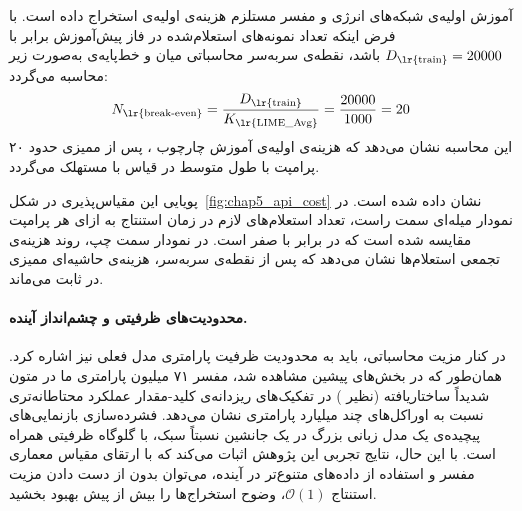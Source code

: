 آموزش اولیه‌ی شبکه‌های انرژی و مفسر مستلزم هزینه‌ی اولیه‌ی استخراج داده است. با فرض اینکه تعداد نمونه‌های استعلام‌شده در فاز پیش‌آموزش برابر با $D_{\text{\lr{train}}} = 20000$ باشد، نقطه‌ی سربه‌سر محاسباتی میان  و خط‌پایه‌ی  به‌صورت زیر محاسبه می‌گردد:
\begin{equation}
    N_{\text{\lr{break-even}}} = \frac{D_{\text{\lr{train}}}}{K_{\text{\lr{LIME\_Avg}}}} = \frac{20000}{1000} = 20
\end{equation}
این محاسبه نشان می‌دهد که هزینه‌ی اولیه‌ی آموزش چارچوب ، پس از ممیزی حدود ۲۰ پرامپت با طول متوسط در قیاس با  مستهلک می‌گردد.

پویایی این مقیاس‌پذیری در شکل~\ref{fig:chap5_api_cost} نشان داده شده است. در نمودار میله‌ای سمت راست، تعداد استعلام‌های لازم در زمان استنتاج به ازای هر پرامپت مقایسه شده است که در  برابر با صفر است. در نمودار سمت چپ، روند هزینه‌ی تجمعی استعلام‌ها نشان می‌دهد که پس از نقطه‌ی سربه‌سر، هزینه‌ی حاشیه‌ای ممیزی در  ثابت می‌ماند.

\paragraph{محدودیت‌های ظرفیتی و چشم‌انداز آینده.}
در کنار مزیت محاسباتی، باید به محدودیت ظرفیت پارامتری مدل فعلی  نیز اشاره کرد. همان‌طور که در بخش‌های پیشین مشاهده شد، مفسر ۷۱ میلیون پارامتری ما در متون شدیداً ساختاریافته (نظیر ) در تفکیک‌های ریزدانه‌ی کلید-مقدار عملکرد محتاطانه‌تری نسبت به اوراکل‌های چند میلیارد پارامتری نشان می‌دهد. فشرده‌سازی بازنمایی‌های پیچیده‌ی یک مدل زبانی بزرگ در یک جانشین نسبتاً سبک، با گلوگاه ظرفیتی همراه است. با این حال، نتایج تجربی این پژوهش اثبات می‌کند که با ارتقای مقیاس معماری مفسر و استفاده از داده‌های متنوع‌تر در آینده، می‌توان بدون از دست دادن مزیت استنتاج $\mathcal{O}(1)$، وضوح استخراج‌ها را بیش از پیش بهبود بخشید.
